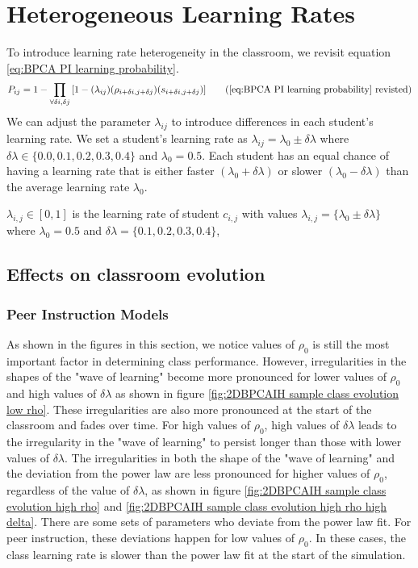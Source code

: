 \chapter{Heterogeneous Learning Rates}

To introduce learning rate heterogeneity in the classroom, we revisit equation \ref{eq:BPCA PI learning probability}. 
\begin{equation*}
    P_{ij} = 1 - \prod_{\forall \delta i, \delta j}{\lbrack1-(\lambda_{ij})(\rho_{i+\delta i, j+\delta j})(s_{i+\delta i, j+\delta j})}\rbrack
    \tag{\ref{eq:BPCA PI learning probability} revisted}
\end{equation*}
We can adjust the parameter $\lambda_{ij}$ to introduce differences in each student's learning rate. 
We set a student's learning rate as $\lambda_{ij} = \lambda_0 \pm \delta\lambda$ where $\delta\lambda \in \lbrace 0.0,0.1, 0.2, 0.3, 0.4\rbrace$ and $\lambda_0 = 0.5$. 
Each student has an equal chance of having a learning rate that is either faster $(\lambda_0 + \delta\lambda)$ or slower $(\lambda_0 - \delta\lambda)$ than the average learning rate $\lambda_0$. 

$\lambda_{i,j} \in [0,1]$ is the learning rate of student $c_{i,j}$ with values $\lambda_{i,j} = \lbrace \lambda_0 \pm \delta \lambda \rbrace$ where $\lambda_0 = 0.5$ and $\delta \lambda = \lbrace 0.1, 0.2, 0.3, 0.4 \rbrace$, 

\section{Effects on classroom evolution}\label{sec:BPCAIH effects on classroom evolution}
\subsection{Peer Instruction Models}
As shown in the figures in this section, we notice values of $\rho_0$ is still the most important factor in determining class performance. 
However, irregularities in the shapes of the "wave of learning" become more pronounced for lower values of $\rho_0$ and high values of $\delta\lambda$ as shown in figure \ref{fig:2DBPCAIH sample class evolution low rho}.
These irregularities are also more pronounced at the start of the classroom and fades over time.
For high values of $\rho_0$, high values of $\delta\lambda$ leads to the irregularity in the "wave of learning" to persist longer than those with lower values of $\delta\lambda$.
The irregularities in both the shape of the "wave of learning" and the deviation from the power law are less pronounced for higher values of $\rho_0$, regardless of the value of $\delta\lambda$, as shown in figure \ref{fig:2DBPCAIH sample class evolution high rho} and \ref{fig:2DBPCAIH sample class evolution high rho high delta}.
There are some sets of parameters who deviate from the power law fit. For peer instruction, these deviations happen for low values of $\rho_0$.
In these cases, the class learning rate is slower than the power law fit at the start of the simulation.

